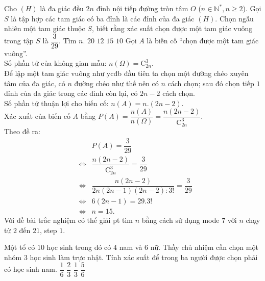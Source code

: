 \begin{ex}%
	Cho $(H)$ là đa giác đều $2n$ đỉnh nội tiếp đường tròn tâm $O$ ($n\in {\mathbb{N}}^{*},n\ge 2$). Gọi $S$ là tập hợp các tam giác có ba đỉnh là các đỉnh của đa giác $(H)$. Chọn ngẫu nhiên một tam giác thuộc $S$, biết rằng xác suất chọn được một tam giác vuông trong tập $S$ là $\dfrac{3}{29}$. Tìm $n$. 
	\choice
	{$20$}
	{$12$}
	{\True $15$}
	{$10$}
	\loigiai
	{
		Gọi $A$ là biến cố “chọn được một tam giác vuông”.\\
		Số phần tử của không gian mẫu: $n(\Omega)=\mathrm {C}_{2n}^3$.\\
		Để lập một tam giác vuông như ycđb đầu tiên ta chọn một đường chéo xuyên tâm của đa giác, có $n$ đường chéo như thế nên có $n$ cách chọn; sau đó chọn tiếp $1$ đỉnh của đa giác trong các đỉnh còn lại, có $2n-2$ cách chọn.\\
		Số phần tử thuận lợi cho biến cố: $n(A)=n.(2n-2)$.\\
		Xác xuất của biến cố $A$ bằng $P(A)=\dfrac{n(A)}{n(\Omega)}=\dfrac{n(2n-2)}{\mathrm {C}_{2n}^3}$.\\
		Theo đề ra:
		\begin{eqnarray*}
			& & P(A)=\dfrac{3}{29}\\
			&\Leftrightarrow & \dfrac{n(2n-2)}{\mathrm {C}_{2n}^3}=\dfrac{3}{29}\\
			&\Leftrightarrow & \dfrac{n(2n-2)}{2n(2n-1)(2n-2):3!}=\dfrac{3}{29}\\
			&\Leftrightarrow & 6(2n-1)=29.3!\\
			&\Leftrightarrow & n=15.
		\end{eqnarray*}
		Với đề bài trắc nghiệm có thể giải pt tìm $n$ bằng cách sử dụng mode $7$ với $n$ chạy từ $2$ đến $21$, step $1$.
	}
\end{ex}%
\begin{ex}%
	Một tổ có $10$ học sinh trong đó có $4$ nam và $6$ nữ. Thầy chủ nhiệm cần chọn một nhóm $3$ học sinh làm trực nhật. Tính xác suất để trong ba người được chọn phải có học sinh nam.
	\choice
	{$\dfrac 16$}
	{$\dfrac 23$}
	{$\dfrac 13$}
	{\True $\dfrac 56$}
\end{ex}%
